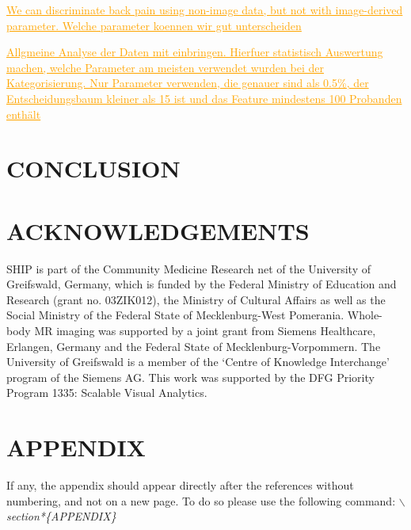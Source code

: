 \documentclass[a4paper,twoside]{style/article}
\newcommand{\com}[1]{\textcolor{orange}{\uline{#1}}}
\begin{document}
\com{We can discriminate back pain using non-image data, but not with image-derived parameter. Welche parameter koennen wir gut unterscheiden}

\com{Allgmeine Analyse der Daten mit einbringen. Hierfuer statistisch Auswertung machen, welche Parameter am meisten verwendet wurden bei der Kategorisierung. Nur Parameter verwenden, die genauer sind als 0.5\%, der Entscheidungsbaum kleiner als 15 ist und das Feature mindestens 100 Probanden enthält }

\section{\uppercase{Conclusion}}
\label{sec:Conclusion}

\section*{\uppercase{Acknowledgements}}

\noindent SHIP is part of the Community Medicine Research net of the University of Greifswald, Germany, which is funded by the Federal Ministry of Education and Research (grant no. 03ZIK012), the Ministry of Cultural Affairs as well as the Social Ministry of the Federal State of Mecklenburg-West Pomerania. Whole-body MR imaging was supported by a joint grant from Siemens Healthcare, Erlangen, Germany and the Federal State of Mecklenburg-Vorpommern. The University of Greifswald is a member of the ‘Centre of Knowledge Interchange’ program of the Siemens AG. This work was supported by the DFG Priority Program 1335: Scalable Visual Analytics.


\vfill

{\small
}


\section*{\uppercase{Appendix}}

\noindent If any, the appendix should appear directly after the
references without numbering, and not on a new page. To do so please use the following command:
\textit{$\backslash$section*\{APPENDIX\}}

\vfill
\end{document}

